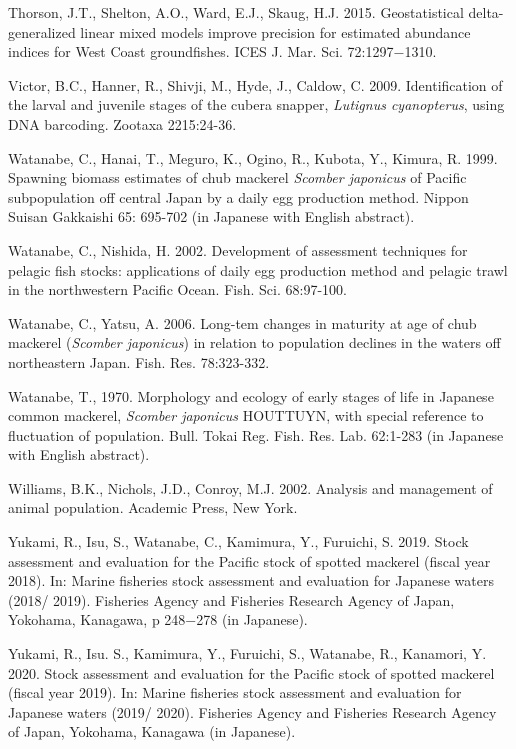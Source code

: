 \documentclass[12pt]{article}
\begin{document}
\begin{linenumbers}
\hangindent=30pt
\noindent
Thorson, J.T., Shelton, A.O., Ward, E.J., Skaug, H.J. 2015. Geostatistical delta-generalized linear mixed models improve precision for estimated abundance indices for West Coast groundfishes. ICES J. Mar. Sci. 72:1297−1310.

\hangindent=30pt
\noindent
Victor, B.C., Hanner, R., Shivji, M., Hyde, J., Caldow, C. 2009. Identification of the larval and juvenile stages of the cubera snapper, \textit{Lutignus cyanopterus}, using DNA barcoding. Zootaxa 2215:24-36.

\hangindent=30pt
\noindent
Watanabe, C., Hanai, T., Meguro, K., Ogino, R., Kubota, Y., Kimura, R. 1999. Spawning biomass estimates of chub mackerel \textit{Scomber japonicus} of Pacific subpopulation off central Japan by a daily egg production method. Nippon Suisan Gakkaishi 65: 695-702 (in Japanese with English abstract).

\hangindent=30pt
\noindent
Watanabe, C., Nishida, H. 2002. Development of assessment techniques for pelagic fish stocks: applications of daily egg production method and pelagic trawl in the northwestern Pacific Ocean. Fish. Sci. 68:97-100.

\hangindent=30pt
\noindent
Watanabe, C., Yatsu, A. 2006. Long-tem changes in maturity at age of chub mackerel (\textit{Scomber japonicus}) in relation to population declines in the waters off northeastern Japan. Fish. Res. 78:323-332.

\hangindent=30pt
\noindent
Watanabe, T., 1970. Morphology and ecology of early stages of life in Japanese common mackerel, \textit{Scomber japonicus} HOUTTUYN, with special reference to fluctuation of population. Bull. Tokai Reg. Fish. Res. Lab. 62:1-283 (in Japanese with English abstract).

\hangindent=30pt
\noindent
Williams, B.K., Nichols, J.D., Conroy, M.J. 2002. Analysis and management of animal population. Academic Press, New York.

\hangindent=30pt
\noindent
Yukami, R., Isu, S., Watanabe, C., Kamimura, Y., Furuichi, S. 2019. Stock assessment and evaluation for the Pacific stock of spotted mackerel (fiscal year 2018). In: Marine fisheries stock assessment and evaluation for Japanese waters (2018/ 2019). Fisheries Agency and Fisheries Research Agency of Japan, Yokohama, Kanagawa, p 248−278 (in Japanese).

\hangindent=30pt
\noindent
Yukami, R., Isu. S., Kamimura, Y., Furuichi, S., Watanabe, R., Kanamori, Y. 2020. Stock assessment and evaluation for the Pacific stock of spotted mackerel (fiscal year 2019). In: Marine fisheries stock assessment and evaluation for Japanese waters (2019/ 2020). Fisheries Agency and Fisheries Research Agency of Japan, Yokohama, Kanagawa (in Japanese).


\end{linenumbers}
\end{document}
